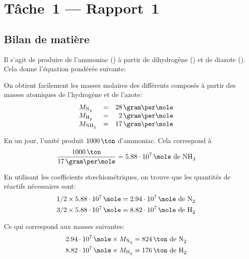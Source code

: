 \chapter{Tâche~1 --- Rapport~1}

\section{Bilan de matière}
\label{sec:matiere}

Il s'agit de produire de l'ammoniac () à partir de dihydrogène ()
et de diazote ().
Cela donne l'équation pondérée suivante:
\begin{center}
\end{center}

On obtient facilement les masses molaires des différents composés à partir
des masses atomiques de l'hydrogène et de l'azote:
\begin{equation*}
    \begin{array}{lcr}
        M_{\ce{N2}} &=& 28\,\gram\per\mole\\
        M_{\ce{H2}} &=& 2\,\gram\per\mole\\
        M_{\ce{NH3}} &=& 17\,\gram\per\mole\\
    \end{array}
\end{equation*}

En un jour, l'unité produit $1000\,\ton$ d'ammoniac.
Cela correspond à
\begin{equation}
    \label{eq:mole-nh3}
    \frac{1000\,\ton}{17\,\gram\per\mole} =
    5.88\cdot10^7\,\mole\mbox{ de \ce{NH3}}
\end{equation}

En utilisant les coefficients stœchiométriques, on trouve que les quantités de
réactifs nécessaires sont:
\begin{align*}
    1/2 \times 5.88\cdot10^7\,\mole &=
    2.94\cdot10^7\,\mole \mbox{ de \ce{N2}} \\
    3/2 \times 5.88\cdot10^7\,\mole &=
    8.82\cdot10^7\,\mole \mbox{ de \ce{H2}} \\
\end{align*}

Ce qui correspond aux masses suivantes:
\begin{align*}
    2.94\cdot10^7\,\mole \times M_{\ce{N2}} &= 824\,\ton \mbox{ de \ce{N2}} \\
    8.82\cdot10^7\,\mole \times M_{\ce{H2}} &= 176\,\ton \mbox{ de \ce{H2}} \\
\end{align*}


